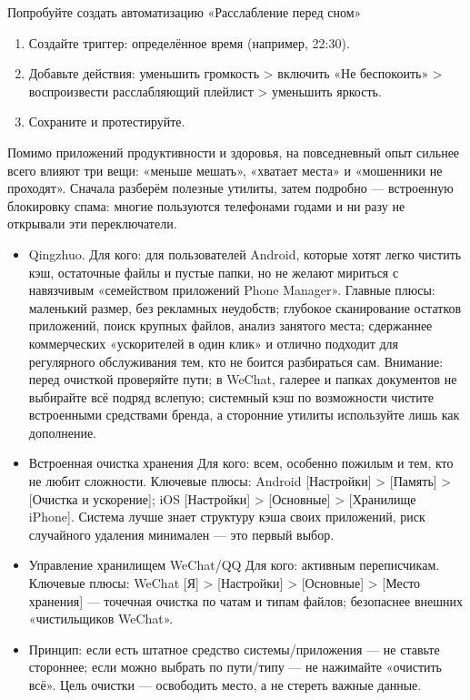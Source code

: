\begin{tcbpractice}{Попробуйте создать автоматизацию «Расслабление перед сном»}
\begin{enumerate}
  \item Создайте триггер: определённое время (например, 22:30).
  \item Добавьте действия: уменьшить громкость > включить «Не беспокоить» > воспроизвести расслабляющий плейлист > уменьшить яркость.
  \item Сохраните и протестируйте.
\end{enumerate}

\end{tcbpractice}


Помимо приложений продуктивности и здоровья, на повседневный опыт сильнее всего влияют три вещи: «меньше мешать», «хватает места» и «мошенники не проходят». Сначала разберём полезные утилиты, затем подробно — встроенную блокировку спама: многие пользуются телефонами годами и ни разу не открывали эти переключатели.


\begin{itemize}
  \item Qingzhuo. Для кого: для пользователей Android, которые хотят легко чистить кэш, остаточные файлы и пустые папки, но не желают мириться с навязчивым «семейством приложений Phone Manager». Главные плюсы: маленький размер, без рекламных неудобств; глубокое сканирование остатков приложений, поиск крупных файлов, анализ занятого места; сдержаннее коммерческих «ускорителей в один клик» и отлично подходит для регулярного обслуживания тем, кто не боится разбираться сам. Внимание: перед очисткой проверяйте пути; в WeChat, галерее и папках документов не выбирайте всё подряд вслепую; системный кэш по возможности чистите встроенными средствами бренда, а сторонние утилиты используйте лишь как дополнение.
  \item Встроенная очистка хранения Для кого: всем, особенно пожилым и тем, кто не любит сложности. Ключевые плюсы: Android [Настройки] > [Память] > [Очистка и ускорение]; iOS [Настройки] > [Основные] > [Хранилище iPhone]. Система лучше знает структуру кэша своих приложений, риск случайного удаления минимален — это первый выбор.
  \item Управление хранилищем WeChat/QQ Для кого: активным переписчикам. Ключевые плюсы: WeChat [Я] > [Настройки] > [Основные] > [Место хранения] — точечная очистка по чатам и типам файлов; безопаснее внешних «чистильщиков WeChat».
  \item Принцип: если есть штатное средство системы/приложения — не ставьте стороннее; если можно выбрать по пути/типу — не нажимайте «очистить всё». Цель очистки — освободить место, а не стереть важные данные.
\end{itemize}

